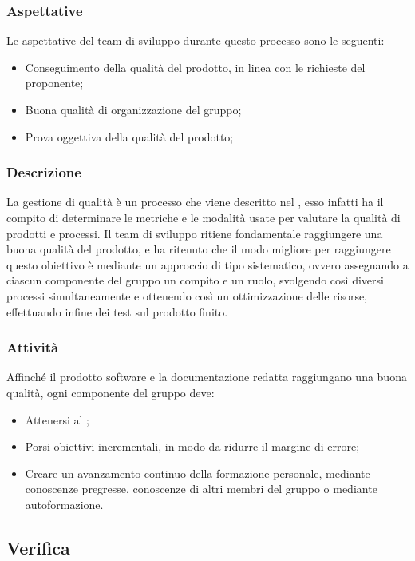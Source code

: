\subsubsection{Aspettative}
Le aspettative del team di sviluppo durante questo processo sono le seguenti:
\begin {itemize}
    \item Conseguimento della qualità del prodotto, in linea con le richieste del proponente;
    \item Buona qualità di organizzazione del gruppo;
    \item Prova oggettiva della qualità del prodotto;
\end {itemize}
\subsubsection{Descrizione}
La gestione di qualità è un processo che viene descritto nel \docNamePdQLow{}, esso infatti ha il compito di determinare le metriche e le modalità usate per valutare la qualità di prodotti e processi.
Il team di sviluppo ritiene fondamentale raggiungere una buona qualità del prodotto, e ha ritenuto che il modo migliore per raggiungere questo obiettivo è mediante un approccio di tipo sistematico, ovvero assegnando a ciascun componente del gruppo un compito e un ruolo, svolgendo così diversi processi simultaneamente e ottenendo così un ottimizzazione delle risorse, effettuando infine dei test sul prodotto finito. 
\subsubsection{Attività}
Affinché il prodotto software e la documentazione redatta raggiungano una buona qualità, ogni componente del gruppo \groupName{} deve:
\begin{itemize}
    \item Attenersi al \docNamePdQLow{};
    \item Porsi obiettivi incrementali, in modo da ridurre il margine di errore;
    \item Creare un avanzamento continuo della formazione personale, mediante conoscenze pregresse, conoscenze di altri membri del gruppo o mediante autoformazione. 
 \end {itemize}   


 \vspace{2cm}

\subsection{Verifica} \label{subsection: Verifica}
